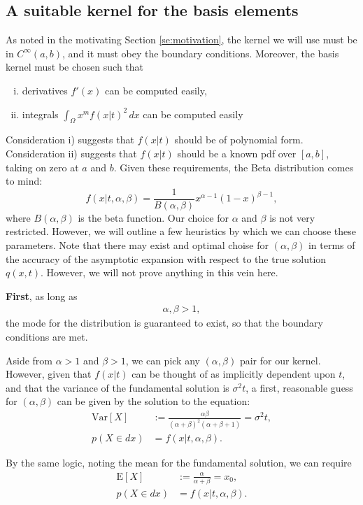 \documentclass[10pt]{article}
\newcommand{\E}[1]{\mbox{E}\left[#1\right]}
\newcommand{\Var}[1]{\mbox{Var}\left[#1\right]}
\begin{document}
\subsection{A suitable kernel for the basis elements}
As noted in the motivating Section \ref{se:motivation}, the kernel we
will use must be in $C^{\infty}(a,b)$, and it must obey the boundary
conditions. Moreover, the basis kernel must be chosen such that
\begin{enumerate}[i)]
\item derivatives $f'(x)$ can be computed easily, 
\item integrals $\int_{\Omega} x^m f(x|t)^2\, dx$ can be computed easily
\end{enumerate}
Consideration i) suggests that $f(x|t)$ should be of polynomial
form. Consideration ii) suggests that $f(x|t)$ should be a known pdf
over $[a,b]$, taking on zero at $a$ and $b$.  Given these
requirements, the Beta distribution comes to mind:
\[
  f(x|t, \alpha, \beta) = \frac{1}{B(\alpha,\beta)} x^{\alpha-1}(1-x)^{\beta-1},
\]
where $B(\alpha,\beta)$ is the beta function. Our choice for $\alpha$
and $\beta$ is not very restricted. However, we will outline a few
heuristics by which we can choose these parameters. Note that there
may exist and optimal choise for $(\alpha, \beta)$ in terms of the
accuracy of the asymptotic expansion with respect to the true solution
$q(x,t)$. However, we will not prove anything in this vein here.

\textbf{First}, as long as
\begin{align}
  \alpha, \beta > 1, \label{eq:lower-bound}
\end{align}
the mode for the distribution is guaranteed to
exist, so that the boundary conditions are met.

Aside from $\alpha > 1$ and $\beta > 1$, we can pick any
$(\alpha,\beta)$ pair for our kernel. However, given that $f(x|t)$ can
be thought of as implicitly dependent upon $t$, and that the variance
of the fundamental solution is $\sigma^2t$, a first, reasonable guess
for $(\alpha,\beta)$ can be given by the solution to the equation:
\begin{align}
  \Var{X} &:= \frac{\alpha \beta}{(\alpha+\beta)^2(\alpha+\beta+1)} = \sigma^2t, \label{eq:var-restriction}\\
  p(X \in dx) &= f(x|t, \alpha, \beta). \nonumber
\end{align}

By the same logic, noting the mean for the fundamental solution, we can require
\begin{align}
  \E{X} &:= \frac{\alpha}{\alpha+\beta} = x_0, \label{eq:mean-restriction}\\
  p(X \in dx) &= f(x|t, \alpha, \beta). \nonumber
\end{align}
\end{document}
